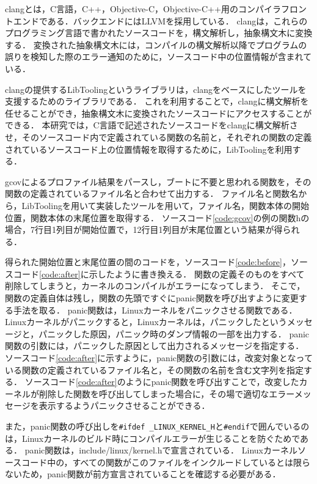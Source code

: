 \documentclass[graduation-thesis]{mlarticle}
\begin{document}
clangとは，C言語，C++，Objective-C，Objective-C++用のコンパイラフロントエンドである．バックエンドにはLLVMを採用している．
clangは，これらのプログラミング言語で書かれたソースコードを，構文解析し，抽象構文木に変換する．
変換された抽象構文木には，コンパイルの構文解析以降でプログラムの誤りを検知した際のエラー通知のために，ソースコード中の位置情報が含まれている．

clangの提供するLibToolingというライブラリは，clangをベースにしたツールを支援するためのライブラリである．
これを利用することで，clangに構文解析を任せることができ，抽象構文木に変換されたソースコードにアクセスすることができる．
本研究では，C言語で記述されたソースコードをclangに構文解析させ，そのソースコード内で定義されている関数の名前と，それぞれの関数の定義されているソースコード上の位置情報を取得するために，LibToolingを利用する．

gcovによるプロファイル結果をパースし，ブートに不要と思われる関数を，その関数の定義されているファイル名と合わせて出力する．
ファイル名と関数名から，LibToolingを用いて実装したツールを用いて，ファイル名，関数本体の開始位置，関数本体の末尾位置を取得する．
ソースコード\ref{code:gcov}の例の関数hの場合，7行目1列目が開始位置で，12行目1列目が末尾位置という結果が得られる．

得られた開始位置と末尾位置の間のコードを，ソースコード\ref{code:before}，ソースコード\ref{code:after}に示したように書き換える．
関数の定義そのものをすべて削除してしまうと，カーネルのコンパイルがエラーになってしまう．
そこで，関数の定義自体は残し，関数の先頭ですぐにpanic関数を呼び出すように変更する手法を取る．
panic関数は，Linuxカーネルをパニックさせる関数である．Linuxカーネルがパニックすると，Linuxカーネルは，パニックしたというメッセージと，パニックした原因，パニック時のダンプ情報の一部を出力する．
panic関数の引数には，パニックした原因として出力されるメッセージを指定する．
ソースコード\ref{code:after}に示すように，panic関数の引数には，改変対象となっている関数の定義されているファイル名と，その関数の名前を含む文字列を指定する．
ソースコード\ref{code:after}のようにpanic関数を呼び出すことで，改変したカーネルが削除した関数を呼び出してしまった場合に，その場で適切なエラーメッセージを表示するようパニックさせることができる．

また，panic関数の呼び出しを\texttt{\#ifdef \_LINUX\_KERNEL\_H}と\texttt{\#endif}で囲んでいるのは，Linuxカーネルのビルド時にコンパイルエラーが生じることを防ぐためである．
panic関数は，include/linux/kernel.hで宣言されている．
Linuxカーネルソースコード中の，すべての関数がこのファイルをインクルードしているとは限らないため，panic関数が前方宣言されていることを確認する必要がある．
\end{document}
